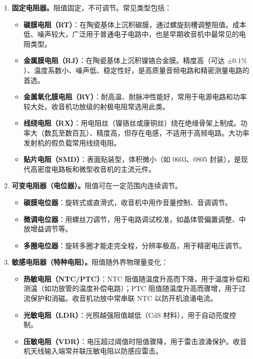 \documentclass[12pt,UTF8]{ctexbook}
\begin{document}
\begin{enumerate}
\item \textbf{固定电阻器。}阻值固定，不可调节。常见类型包括：
\begin{itemize}
  \item \textbf{碳膜电阻（RT）}：在陶瓷基体上沉积碳膜，通过螺旋刻槽调整阻值。成本低、噪声较大，广泛用于普通电子电路中，也是早期收音机中最常见的电阻类型。
  \item \textbf{金属膜电阻（RJ）}：在陶瓷基体上沉积镍铬合金膜。精度高（可达 $\pm0.1\%$）、温度系数小、噪声低、稳定性好，是高质量音频电路和精密测量电路的首选。
  \item \textbf{金属氧化膜电阻（RY）}：耐高温、耐脉冲性能好，常用于电源电路和功率较大处。收音机功放级的射极电阻常选用此类。
  \item \textbf{线绕电阻（RX）}：用电阻丝（镍铬丝或康铜丝）绕在绝缘骨架上制成。功率大（数瓦至数百瓦）、精度高，但存在电感，不适用于高频电路。大功率发射机的假负载常用线绕电阻。
  \item \textbf{贴片电阻（SMD）}：表面贴装型，体积微小（如 $0603$、$0805$ 封装），是现代高密度电路板和微型收音机的主流元件。
\end{itemize}

\item \textbf{可变电阻器（电位器）。}阻值可在一定范围内连续调节。
\begin{itemize}
  \item \textbf{碳膜电位器}：旋转式或直滑式，收音机中用作音量控制、音调调节。
  \item \textbf{微调电位器}：用螺丝刀调节，用于电路调试校准，如晶体管偏置调整、中放增益调节等。
  \item \textbf{多圈电位器}：旋转多圈才能走完全程，分辨率极高，用于精密电压调节。
\end{itemize}

\item \textbf{敏感电阻器（特种电阻）。}阻值随外界物理量变化：
\begin{itemize}
  \item \textbf{热敏电阻（NTC/PTC）}：NTC 阻值随温度升高而下降，用于温度补偿和测温（如功放管的温度补偿电路）；PTC 阻值随温度升高而骤增，用于过流保护和消磁。收音机功放中常串联 NTC 以防开机浪涌电流。
  \item \textbf{光敏电阻（LDR）}：光照越强阻值越低（CdS 材料），用于自动亮度控制。
  \item \textbf{压敏电阻（VDR）}：电压超过阈值时阻值骤降，用于雷击浪涌保护。收音机天线输入端常并联压敏电阻以防感应雷击。
\end{itemize}
\end{enumerate}
\end{document}
